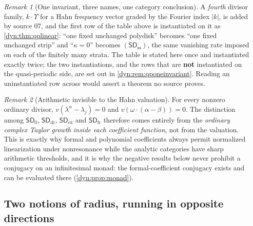 \documentclass[11pt,letterpaper]{article}
\theoremstyle{definition}
\theoremstyle{remark}
\newtheorem{remark}[remark]{Remark}
\newcommand{\sdz}{\mathsf{SD}_{0}}
\newcommand{\sddr}{\mathsf{SD}_{\mathrm{dr}}}
\newcommand{\sdex}{\mathsf{SD}_{\mathrm{ex}}}
\newcommand{\sdfr}{\mathsf{SD}_{\mathrm{fr}}}
\newcommand{\sdss}{\mathsf{SD}_{\mathrm{ss}}}
\numberwithin{equation}{section}
\begin{document}
\begin{remark}[One invariant, three names, one category conclusion]
A \emph{fourth} divisor family, $k\cdot\Upsilon$ for a Hahn frequency
vector graded by the Fourier index $|k|$, is added by source 07, and the
first row of the table above is instantiated on it as
\cref{dyn:thm:qplinear}: ``one fixed unchanged polydisk'' becomes ``one
fixed unchanged strip'' and ``$\kappa=0$'' becomes $(\sdss)$, the same
vanishing rate imposed on each of the finitely many strata. The table is
stated here once and instantiated exactly twice; the two instantiations,
and the rows that are \textbf{not} instantiated on the quasi-periodic
side, are set out in \cref{dyn:rem:qponeinvariant}. Reading an
uninstantiated row across would assert a theorem no source proves.
\end{remark}

\begin{remark}[Arithmetic invisible to the Hahn valuation]
\label{dyn:rem:invisible}
For every nonzero ordinary divisor, $v(\lambda^{\alpha}-\lambda_j)=0$ and
$v(\omega\cdot(\alpha-\beta))=0$. The distinction among $\sdz$, $\sddr$,
$\sdex$ and $\sdfr$ therefore comes entirely from the \emph{ordinary
complex Taylor growth inside each coefficient function}, not from the
valuation. This is exactly why formal and polynomial coefficients always
permit normalized linearization under nonresonance while the analytic
categories have sharp arithmetic thresholds, and it is why the negative
results below never prohibit a conjugacy on an infinitesimal monad: the
formal-coefficient conjugacy exists and can be evaluated there
(\cref{dyn:prop:monad}).
\end{remark}

\subsection{Two notions of radius, running in opposite directions}
\label{dyn:subsec:radius}
\end{document}
